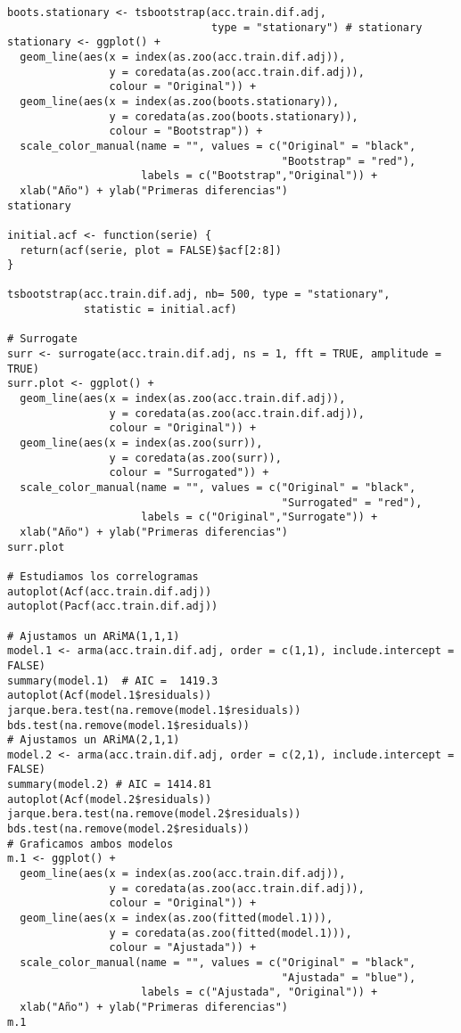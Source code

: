 \documentclass[12pt,a4paper,oneside]{article}
\begin{document}
\begin{Verbatim}[fontsize=\footnotesize]
boots.stationary <- tsbootstrap(acc.train.dif.adj,
                                type = "stationary") # stationary
stationary <- ggplot() +
  geom_line(aes(x = index(as.zoo(acc.train.dif.adj)),
                y = coredata(as.zoo(acc.train.dif.adj)),
                colour = "Original")) +
  geom_line(aes(x = index(as.zoo(boots.stationary)),
                y = coredata(as.zoo(boots.stationary)),
                colour = "Bootstrap")) +
  scale_color_manual(name = "", values = c("Original" = "black",
                                           "Bootstrap" = "red"),
                     labels = c("Bootstrap","Original")) +
  xlab("Año") + ylab("Primeras diferencias")
stationary

initial.acf <- function(serie) {
  return(acf(serie, plot = FALSE)$acf[2:8])
}

tsbootstrap(acc.train.dif.adj, nb= 500, type = "stationary",
            statistic = initial.acf)

# Surrogate
surr <- surrogate(acc.train.dif.adj, ns = 1, fft = TRUE, amplitude = TRUE)
surr.plot <- ggplot() +
  geom_line(aes(x = index(as.zoo(acc.train.dif.adj)),
                y = coredata(as.zoo(acc.train.dif.adj)),
                colour = "Original")) +
  geom_line(aes(x = index(as.zoo(surr)),
                y = coredata(as.zoo(surr)),
                colour = "Surrogated")) +
  scale_color_manual(name = "", values = c("Original" = "black",
                                           "Surrogated" = "red"),
                     labels = c("Original","Surrogate")) +
  xlab("Año") + ylab("Primeras diferencias")
surr.plot

# Estudiamos los correlogramas
autoplot(Acf(acc.train.dif.adj))
autoplot(Pacf(acc.train.dif.adj))

# Ajustamos un ARiMA(1,1,1)
model.1 <- arma(acc.train.dif.adj, order = c(1,1), include.intercept = FALSE)
summary(model.1)  # AIC =  1419.3
autoplot(Acf(model.1$residuals))
jarque.bera.test(na.remove(model.1$residuals))
bds.test(na.remove(model.1$residuals))
# Ajustamos un ARiMA(2,1,1)
model.2 <- arma(acc.train.dif.adj, order = c(2,1), include.intercept = FALSE)
summary(model.2) # AIC = 1414.81
autoplot(Acf(model.2$residuals))
jarque.bera.test(na.remove(model.2$residuals))
bds.test(na.remove(model.2$residuals))
# Graficamos ambos modelos
m.1 <- ggplot() +
  geom_line(aes(x = index(as.zoo(acc.train.dif.adj)),
                y = coredata(as.zoo(acc.train.dif.adj)),
                colour = "Original")) +
  geom_line(aes(x = index(as.zoo(fitted(model.1))),
                y = coredata(as.zoo(fitted(model.1))),
                colour = "Ajustada")) +
  scale_color_manual(name = "", values = c("Original" = "black",
                                           "Ajustada" = "blue"),
                     labels = c("Ajustada", "Original")) +
  xlab("Año") + ylab("Primeras diferencias")
m.1


\end{Verbatim}
\end{document}
